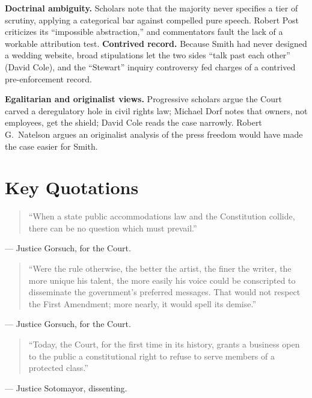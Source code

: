 \documentclass[12pt]{article}
\begin{document}
\textbf{Doctrinal ambiguity.} Scholars note that the majority never specifies a tier of scrutiny, applying a categorical bar against compelled pure speech. Robert Post criticizes its ``impossible abstraction,'' and commentators fault the lack of a workable attribution test. \textbf{Contrived record.} Because Smith had never designed a wedding website, broad stipulations let the two sides ``talk past each other'' (David Cole), and the ``Stewart'' inquiry controversy fed charges of a contrived pre-enforcement record.

\textbf{Egalitarian and originalist views.} Progressive scholars argue the Court carved a deregulatory hole in civil rights law; Michael Dorf notes that owners, not employees, get the shield; David Cole reads the case narrowly. Robert G.\ Natelson argues an originalist analysis of the press freedom would have made the case easier for Smith.

\section{Key Quotations}

\begin{quote}
``When a state public accommodations law and the Constitution collide, there can be no question which must prevail.''
\end{quote}
\noindent --- Justice Gorsuch, for the Court.

\begin{quote}
``Were the rule otherwise, the better the artist, the finer the writer, the more unique his talent, the more easily his voice could be conscripted to disseminate the government's preferred messages. That would not respect the First Amendment; more nearly, it would spell its demise.''
\end{quote}
\noindent --- Justice Gorsuch, for the Court.

\begin{quote}
``Today, the Court, for the first time in its history, grants a business open to the public a constitutional right to refuse to serve members of a protected class.''
\end{quote}
\noindent --- Justice Sotomayor, dissenting.
\end{document}
